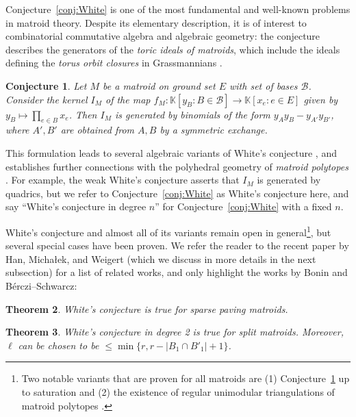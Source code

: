 \documentclass{amsart}
\newtheorem{theorem}{Theorem}[section]
\newtheorem{conjecture}[theorem]{Conjecture}
\newcommand\Bcal{{\mathcal B}}
\begin{document}
Conjecture~\ref{conj:White} is one of the most fundamental and well-known problems in matroid theory. Despite its elementary description, it is of interest to combinatorial commutative algebra and algebraic geometry: the conjecture describes the generators of the {\em toric ideals of matroids}, which include the ideals defining the {\em torus orbit closures} in Grassmannians \cite[Section~13.2]{MichalekSturmfels}.

\begin{conjecture} \label{conj:IM}
    Let $M$ be a matroid on ground set $E$ with set of bases $\Bcal$. Consider the kernel $I_M$ of the map $f_M:\mathbb{K}[y_B:B\in\Bcal]\rightarrow \mathbb{K}[x_e:e\in E]$ given by $y_B\mapsto \prod_{e\in B}x_e$. Then $I_M$ is generated by binomials of the form $y_Ay_B-y_{A'}y_{B'}$, where $A', B'$ are obtained from $A,B$ by a symmetric exchange.
\end{conjecture}

This formulation leads to several algebraic variants of White's conjecture \cite{Haws2009,Herzog2002}, and establishes further connections with the polyhedral geometry of {\em matroid polytopes} \cite{backman2023}. For example, the weak White's conjecture asserts that $I_M$ is generated by quadrics, but we refer to Conjecture~\ref{conj:White} as White's conjecture here, and say ``White's conjecture in degree $n$'' for Conjecture~\ref{conj:White} with a fixed $n$.

White's conjecture and almost all of its variants remain open in general\footnote{Two notable variants that are proven for all matroids are (1) Conjecture~\ref{conj:IM} up to saturation \cite{Lason2014} and (2) the existence of regular unimodular triangulations of matroid polytopes \cite{backman2023}.}, but several special cases have been proven. We refer the reader to the recent paper by Han, Micha\l ek, and Weigert \cite{han2025white} (which we discuss in more details in the next subsection) for a list of related works, and only highlight the works by Bonin and B\'{e}rczi--Schwarcz:

\begin{theorem} \cite{BONIN2013} \label{thm:Bonin}
    White's conjecture is true for {\em sparse paving matroids}.
\end{theorem}

\begin{theorem} \cite{Berczi2024} \label{thm:Berczi_Schwarcz}
    White's conjecture in degree 2 is true for {\em split matroids}. Moreover, $\ell$ can be chosen to be $\leq\min\{r,r-|B_1\cap B'_1|+1\}$.
\end{theorem}
\end{document}
